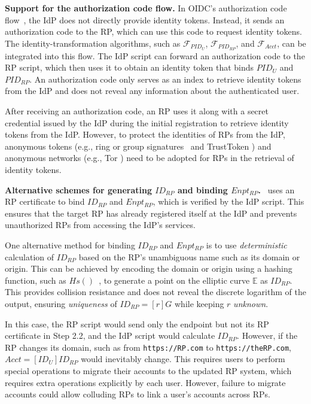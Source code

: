 \noindent \textbf{Support for the authorization code flow.} In OIDC's authorization code flow~\cite{OpenIDConnect}, the IdP does not directly provide identity tokens. Instead, it sends an authorization code to the RP, which can use this code to request identity tokens. The identity-transformation algorithms, such as $\mathcal{F}_{PID_{U}}$, $\mathcal{F}_{PID_{RP}}$, and $\mathcal{F}_{Acct}$, can be integrated into this flow. %
The IdP script can forward an authorization code to the RP script, which then uses it to obtain an identity token that binds $PID_U$ and $PID_{RP}$. An authorization code only serves as an index to retrieve identity tokens from the IdP and does not reveal any information about the authenticated user.


After receiving an authorization code, an RP uses it along with a secret credential issued by the IdP during the initial registration \cite{OpenIDConnect} to retrieve identity tokens from the IdP. However, to protect the identities of RPs from the IdP, anonymous tokens (e.g., ring or group signatures~\cite{ring-sig,chaum1991group} and TrustToken \cite{trusttoken}) and anonymous networks (e.g., Tor \cite{tor}) need to be adopted for RPs in the retrieval of identity tokens.

\noindent \textbf{Alternative schemes for generating $ID_{RP}$ and binding $Enpt_{RP}$.} \usso~uses an RP certificate to bind $ID_{RP}$ and $Enpt_{RP}$, which is verified by the IdP script. This ensures that the target RP has already registered itself at the IdP and prevents unauthorized RPs from accessing the IdP's services.

One alternative method for binding $ID_{RP}$ and $Enpt_{RP}$ is to use \emph{deterministic} calculation of $ID_{RP}$ based on the RP's unambiguous name such as its domain or origin. This can be achieved by encoding the domain or origin using a hashing function, such as $Hs()$~\cite{irtf-cfrg-hash-to-curve-16}, to generate a point on the elliptic curve $\mathbb{E}$ as $ID_{RP}$. This provides collision resistance and does not reveal the discrete logarithm of the output, ensuring \emph{uniqueness} of $ID_{RP} = [r]G$ while keeping $r$ \emph{unknown}. %

In this case, the RP script would send only the endpoint but not its RP certificate in Step 2.2, and the IdP script would calculate $ID_{RP}$. %
However, if the RP changes its domain, such as from \verb+https://RP.com+ to \verb+https://theRP.com+,
$Acct = [ID_U]ID_{RP}$ would inevitably change. This requires users to perform special operations to migrate their accounts to the updated RP system, which requires extra operations explicitly by each user. However, failure to migrate accounts could allow colluding RPs to link a user's accounts across RPs.

